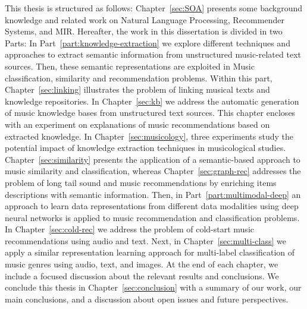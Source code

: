 This thesis is structured as follows: Chapter~\ref{sec:SOA} presents some background knowledge and related work on Natural Language Processing, Recommender Systems, and MIR. Hereafter, the work in this dissertation is divided in two Parts: In Part~\ref{part:knowledge-extraction} we explore different techniques and approaches to extract semantic information from unstructured music-related text sources. Then, these semantic representations are exploited in Music classification, similarity and recommendation problems. Within this part, Chapter~\ref{sec:linking} illustrates the problem of linking musical texts and knowledge repositories. In Chapter~\ref{sec:kb} we address the automatic generation of music knowledge bases from unstructured text sources. This chapter encloses with an experiment on explanations of music recommendations based on extracted knowledge. In Chapter~\ref{sec:musicology}, three experiments study the potential impact of knowledge extraction techniques in musicological studies.
Chapter~\ref{sec:similarity} presents the application of a semantic-based approach to music similarity and classification, whereas Chapter~\ref{sec:graph-rec} addresses the problem of long tail sound and music recommendations by enriching items descriptions with semantic information.
Then, in Part~\ref{part:multimodal-deep} an approach to learn data representations from different data modalities using deep neural networks is applied to music recommendation and classification problems. In Chapter~\ref{sec:cold-rec} we address the problem of cold-start music recommendations using audio and text. Next, in Chapter~\ref{sec:multi-class} we apply a similar representation learning approach for multi-label classification of music genres using audio, text, and images.
At the end of each chapter, we include a focused discussion about the relevant results and conclusions. We conclude this thesis in Chapter~\ref{sec:conclusion} with a summary of our work, our main conclusions, and a discussion about open issues and future perspectives.




